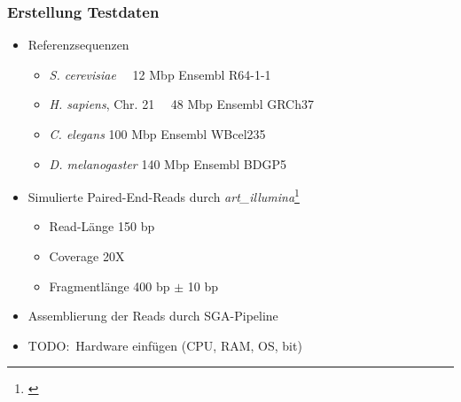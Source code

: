 \documentclass[xcolor=pst]{beamer}
\begin{document}
\begin{frame} %
  \frametitle{Erstellung Testdaten}
  \begin{itemize}
    \item Referenzsequenzen
    \begin{itemize}
      \item \textit{S. cerevisiae}       \tabto{3.5cm}~~12 Mbp \tabto{5cm} Ensembl R64-1-1
      \item \textit{H. sapiens}, Chr. 21 \tabto{3.5cm}~~48 Mbp \tabto{5cm} Ensembl GRCh37
      \item \textit{C. elegans}          \tabto{3.5cm}100 Mbp \tabto{5cm} Ensembl WBcel235
      \item \textit{D. melanogaster}     \tabto{3.5cm}140 Mbp \tabto{5cm} Ensembl BDGP5
    \end{itemize}
    \item Simulierte Paired-End-Reads durch \textit{art\_illumina}\footnote{\cite{Huang:2012kq}}
    \begin{itemize}
      \item Read-Länge 150 bp
      \item Coverage 20X
      \item Fragmentlänge 400 bp $\pm$ 10 bp
    \end{itemize}
    \item Assemblierung der Reads durch SGA-Pipeline
    \item TODO:\ Hardware einfügen (CPU, RAM, OS, bit)
  \end{itemize}
\end{frame}
\end{document}
